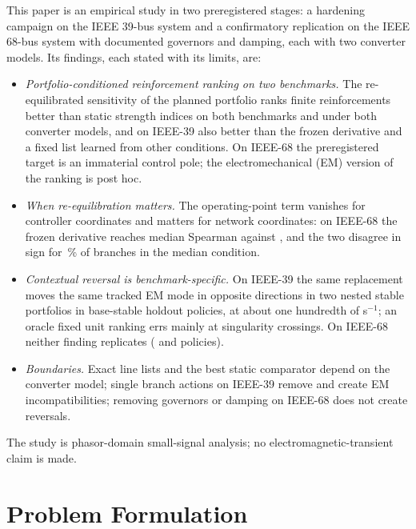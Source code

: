 \documentclass[journal]{IEEEtran}
\theoremstyle{remark}
\begin{document}
This paper is an empirical study in two preregistered stages: a hardening
campaign on the IEEE 39-bus system and a confirmatory replication on the IEEE
68-bus system with documented governors and damping, each with two converter
models. Its findings, each stated with its limits, are:
\begin{itemize}
\item[C1)] \emph{Portfolio-conditioned reinforcement ranking on two benchmarks.}
The re-equilibrated sensitivity of the planned portfolio ranks finite
reinforcements better than static strength indices on both benchmarks and under
both converter models, and on IEEE-39 also better than the frozen derivative and a
fixed list learned from other conditions. On IEEE-68 the preregistered target is
an immaterial control pole; the electromechanical (EM) version of the ranking is
post hoc.
\item[C2)] \emph{When re-equilibration matters.} The operating-point term vanishes
for controller coordinates and matters for network coordinates: on IEEE-68 the
frozen derivative reaches median Spearman \sxRhoFroA{} against \sxRhoA{}, and the
two disagree in sign for \sxSignDisTF\,\% of branches in the median condition.
\item[C3)] \emph{Contextual reversal is benchmark-specific.} On IEEE-39 the same
replacement moves the same tracked EM mode in opposite directions in two nested
stable portfolios in \cntDNew{} base-stable holdout policies, at about one
hundredth of s$^{-1}$; an oracle fixed unit ranking errs mainly at singularity
crossings. On IEEE-68 neither finding replicates (\sxRevA{} and \sxRevB{}
policies).
\item[C4)] \emph{Boundaries.} Exact line lists and the best static comparator
depend on the converter model; single branch actions on IEEE-39 remove and
create EM incompatibilities; removing governors or damping on IEEE-68 does not
create reversals.
\end{itemize}
The study is phasor-domain small-signal analysis; no electromagnetic-transient
claim is made.

\section{Problem Formulation}\label{sec:model}
\end{document}
